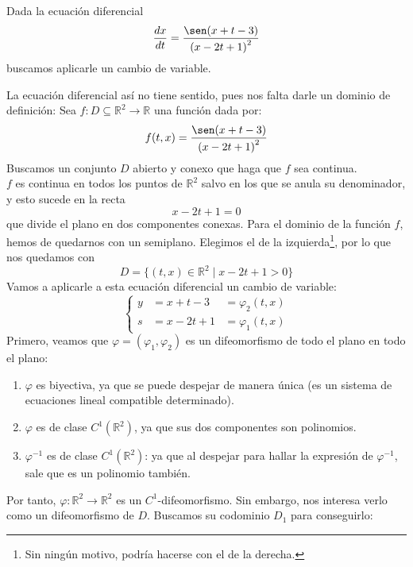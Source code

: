 \begin{ejemplo}
    Dada la ecuación diferencial
    \begin{equation*}
        \dfrac{dx}{dt} = \dfrac{\sen(x+t-3)}{{(x-2t+1)}^{2}}
    \end{equation*}
    buscamos aplicarle un cambio de variable.

    La ecuación diferencial así no tiene sentido, pues nos falta darle un dominio de definición: Sea $f:D\subseteq \mathbb{R}^2\rightarrow\mathbb{R}$ una función dada por:
    \begin{equation*}
        f(t,x) = \dfrac{\sen(x+t-3)}{{(x-2t+1)}^{2}}
    \end{equation*}
    Buscamos un conjunto $D$ abierto y conexo que haga que $f$ sea continua.\\

    $f$ es continua en todos los puntos de $\mathbb{R}^2$ salvo en los que se anula su denominador, y esto sucede en la recta
    \begin{equation*}
        x-2t+1= 0
    \end{equation*}
    que divide el plano en dos componentes conexas. Para el dominio de la función $f$, hemos de quedarnos con un semiplano. Elegimos el de la izquierda\footnote{Sin ningún motivo, podría hacerse con el de la derecha.}, por lo que nos quedamos con
    \begin{equation*}
        D = \{(t,x)\in \mathbb{R}^2 \mid x -2t+1>0 \}
    \end{equation*}
    Vamos a aplicarle a esta ecuación diferencial un cambio de variable:
    \begin{equation*}
        \left\{\begin{array}{rcl}
            y &= x+t-3 &= \varphi_2(t,x) \\
            s &= x-2t+1 &= \varphi_1(t,x)
        \end{array}\right.
    \end{equation*}
    Primero, veamos que $\varphi = (\varphi_1,\varphi_2)$ es un difeomorfismo de todo el plano en todo el plano:
    \begin{enumerate}
        \item $\varphi$ es biyectiva, ya que se puede despejar de manera única (es un sistema de ecuaciones lineal compatible determinado).
        \item $\varphi$ es de clase $C^1(\mathbb{R}^2)$, ya que sus dos componentes son polinomios.
        \item $\varphi^{-1}$ es de clase $C^1(\mathbb{R}^2)$: ya que al despejar para hallar la expresión de $\varphi^{-1}$, sale que es un polinomio también.
    \end{enumerate}
    Por tanto, $\varphi:\mathbb{R}^2\rightarrow\mathbb{R}^2$ es un $C^1$-difeomorfismo. Sin embargo, nos interesa verlo como un difeomorfismo de $D$. Buscamos su codominio $D_1$ para conseguirlo:\\


\end{ejemplo}
